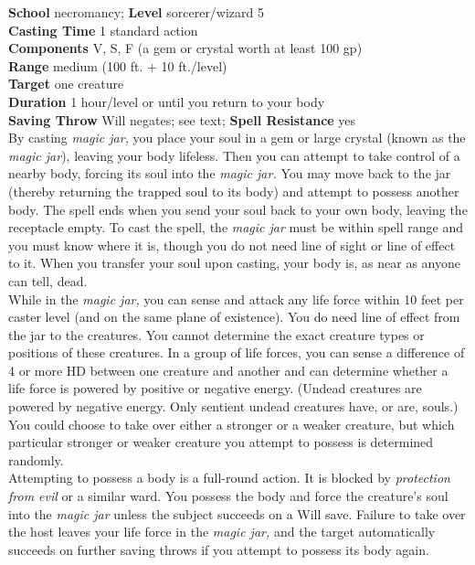 \textbf{School} necromancy; \textbf{Level} sorcerer/wizard 5\\
\textbf{Casting Time} 1 standard action\\
\textbf{Components} V, S, F (a gem or crystal worth at least 100 gp)\\
\textbf{Range} medium (100 ft. + 10 ft./level)\\
\textbf{Target} one creature\\
\textbf{Duration} 1 hour/level or until you return to your body\\
\textbf{Saving Throw }Will negates; see text; \textbf{Spell Resistance} yes\\
By casting \textit{magic jar, }you place your soul in a gem or large crystal (known as the \textit{magic jar}), leaving your body lifeless. Then you can attempt to take control of a nearby body, forcing its soul into the \textit{magic jar. }You may move back to the jar (thereby returning the trapped soul to its body) and attempt to possess another body. The spell ends when you send your soul back to your own body, leaving the receptacle empty. To cast the spell, the \textit{magic jar }must be within spell range and you must know where it is, though you do not need line of sight or line of effect to it. When you transfer your soul upon casting, your body is, as near as anyone can tell, dead. \\
While in the \textit{magic jar, }you can sense and attack any life force within 10 feet per caster level (and on the same plane of existence). You do need line of effect from the jar to the creatures. You cannot determine the exact creature types or positions of these creatures. In a group of life forces, you can sense a difference of 4 or more HD between one creature and another and can determine whether a life force is powered by positive or negative energy. (Undead creatures are powered by negative energy. Only sentient undead creatures have, or are, souls.)\\
You could choose to take over either a stronger or a weaker creature, but which particular stronger or weaker creature you attempt to possess is determined randomly.\\
Attempting to possess a body is a full-round action. It is blocked by \textit{protection from evil }or a similar ward. You possess the body and force the creature's soul into the \textit{magic jar }unless the subject succeeds on a Will save. Failure to take over the host leaves your life force in the \textit{magic jar, }and the target automatically succeeds on further saving throws if you attempt to possess its body again.\\
